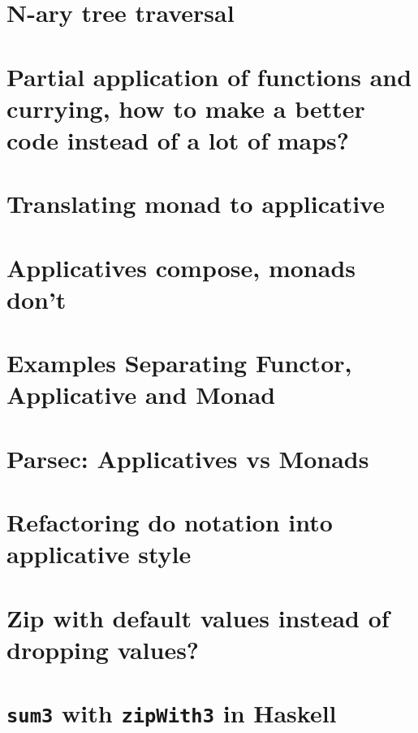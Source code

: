 \documentclass{book}%
\begin{document}
\section{N-ary tree traversal}


\section{Partial application of functions and currying, how to make a better code instead of a lot of maps?}


\section{Translating monad to applicative}


\section{Applicatives compose, monads don't}


\section{Examples Separating Functor, Applicative and Monad}


\section{Parsec: Applicatives vs Monads}


\section{Refactoring do notation into applicative style}


\section{Zip with default values instead of dropping values?}


\section{{\texttt{sum3}} with {\texttt{zipWith3}} in Haskell}

\end{document}
